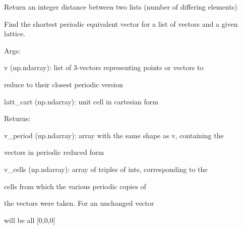 \documentclass[letterpaper,10pt,english]{sphinxmanual}
\begin{document}
\begin{fulllineitems}
\label{doctree/soprano.utils:soprano.utils.list_distance}
Return an integer distance between two lists (number of differing
elements)

\end{fulllineitems}


\begin{fulllineitems}
\label{doctree/soprano.utils:soprano.utils.minimum_periodic}
Find the shortest periodic equivalent vector for a list of vectors and a
given lattice.

\begin{DUlineblock}{0em}
\item[] Args:
\item[]
\begin{DUlineblock}{\DUlineblockindent}
\item[] v (np.ndarray): list of 3-vectors representing points or vectors to
\item[]
\begin{DUlineblock}{\DUlineblockindent}
\item[] reduce to their closest periodic version
\end{DUlineblock}
\item[] latt\_cart (np.ndarray): unit cell in cartesian form
\end{DUlineblock}
\end{DUlineblock}

\begin{DUlineblock}{0em}
\item[] Returns:
\item[]
\begin{DUlineblock}{\DUlineblockindent}
\item[] v\_period (np.ndarray): array with the same shape as v, containing the
\item[]
\begin{DUlineblock}{\DUlineblockindent}
\item[] vectors in periodic reduced form
\end{DUlineblock}
\item[] v\_cells (np.ndarray): array of triples of ints, corresponding to the
\item[]
\begin{DUlineblock}{\DUlineblockindent}
\item[] cells from which the various periodic copies of
\item[] the vectors were taken. For an unchanged vector
\item[] will be all {[}0,0,0{]}
\end{DUlineblock}
\end{DUlineblock}
\end{DUlineblock}

\end{fulllineitems}
\end{document}
